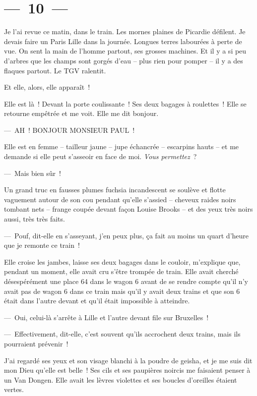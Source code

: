 \documentclass[french,twoside]{book} %
\begin{document}
\section[{— 10 —}]{— 10 —}
\renewcommand{\leftmark}{— 10 —}

\noindent Je l’ai revue ce matin, dans le train. Les mornes plaines de Picardie défilent. Je devais faire un Paris Lille dans la journée. Longues terres labourées à perte de vue. On sent la main de l’homme partout, ses grosses machines. Et il y a si peu d’arbres que les champs sont gorgés d’eau – plus rien pour pomper – il y a des flaques partout. Le TGV ralentit.\par
Et elle, alors, elle apparaît !\par
Elle est là ! Devant la porte coulissante ! Ses deux bagages à roulettes ! Elle se retourne empêtrée et me voit. Elle me dit bonjour.\par
— AH ! BONJOUR MONSIEUR PAUL !\par
Elle est en femme – tailleur jaune – jupe échancrée – escarpins hauts – et me demande si elle peut s’asseoir en face de moi. \emph{Vous permettez} ?\par
— Mais bien sûr !\par
Un grand truc en fausses plumes fuchsia incandescent se soulève et flotte vaguement autour de son cou pendant qu’elle s’assied – cheveux raides noirs tombant nets – frange coupée devant façon Louise Brooks – et des yeux très noirs aussi, très très faits.\par
— Pouf, dit-elle en s’asseyant, j’en peux plus, ça fait au moins un quart d’heure que je remonte ce train !\par
Elle croise les jambes, laisse ses deux bagages dans le couloir, m’explique que, pendant un moment, elle avait cru s’être trompée de train. Elle avait cherché désespérément une place 64 dans le wagon 6 avant de se rendre compte qu’il n’y avait pas de wagon 6 dans ce train mais qu’il y avait deux trains et que son 6 était dans l’autre devant et qu’il était impossible à atteindre.\par
— Oui, celui-là s’arrête à Lille et l’autre devant file sur Bruxelles !\par
— Effectivement, dit-elle, c’est souvent qu’ils accrochent deux trains, mais ils pourraient prévenir !\par
J’ai regardé ses yeux et son visage blanchi à la poudre de geisha, et je me suis dit mon Dieu qu’elle est belle ! Ses cils et ses paupières noircis me faisaient penser à un Van Dongen. Elle avait les lèvres violettes et ses boucles d’oreilles étaient vertes.\par
\end{document}
